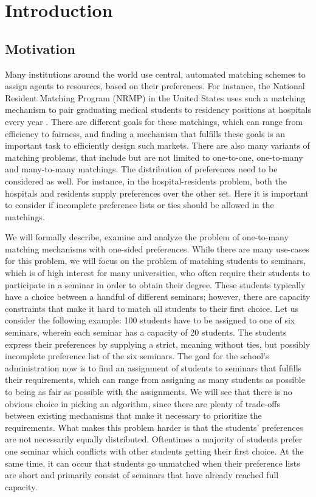 \section{Introduction}
\label{sec:introduction}

\subsection{Motivation}
Many institutions around the world use central, automated matching schemes to assign agents to resources, based on their preferences. For instance, the National Resident Matching Program (NRMP) in the United States uses such a matching mechanism to pair graduating medical students to residency positions at hospitals every year \cite{Roth-NRMP}. There are different goals for these matchings, which can range from efficiency to fairness, and finding a mechanism that fulfills these goals is an important task to efficiently design such markets.
There are also many variants of matching problems, that include but are not limited to one-to-one, one-to-many and many-to-many matchings. The distribution of preferences need to be considered as well. For instance, in the hospital-residents problem, both the hospitals and residents supply preferences over the other set. Here it is important to consider if incomplete preference lists or ties should be allowed in the matchings. 

We will formally describe, examine and analyze the problem of one-to-many matching mechanisms with one-sided preferences. While there are many use-cases for this problem, we will focus on the problem of matching students to seminars, which is of high interest for many universities, who often require their students to participate in a seminar in order to obtain their degree. These students typically have a choice between a handful of different seminars; however, there are capacity constraints that make it hard to match all students to their first choice. Let us consider the following example: 100 students have to be assigned to one of six seminars, wherein each seminar has a capacity of 20 students. The students express their preferences by supplying a strict, meaning without ties, but possibly incomplete preference list of the six seminars. The goal for the school's administration now is to find an assignment of students to seminars that fulfills their requirements, which can range from assigning as many students as possible to being as fair as possible with the assignments. We will see that there is no obvious choice in picking an algorithm, since there are plenty of trade-offs between existing mechanisms that make it necessary to prioritize the requirements.  
What makes this problem harder is that the students' preferences are not necessarily equally distributed. Oftentimes a majority of students prefer one seminar which conflicts with other students getting their first choice. At the same time, it can occur that students go unmatched when their preference lists are short and primarily consist of seminars that have already reached full capacity.

